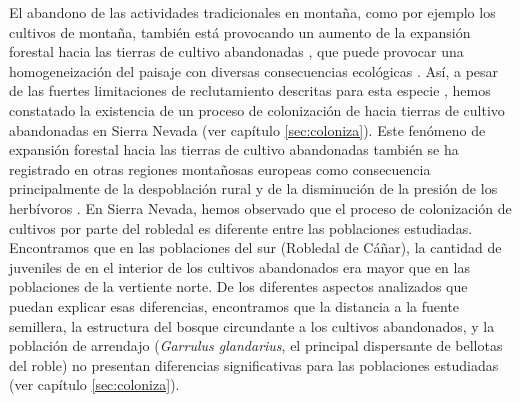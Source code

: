 El abandono de las actividades tradicionales en montaña, como por ejemplo los cultivos de montaña, también está provocando un aumento de la expansión forestal hacia las tierras de cultivo abandonadas \autocites{Piussi2000ExpansionEuropean, AlvarezMartinezetal2014InfluenceLand}, que puede provocar una homogeneización del paisaje \autocites{Mietkiewiczetal2017LongtermChange} con diversas consecuencias ecológicas \autocites{Zimmermannetal2010EffectsLanduse}. Así, a pesar de las fuertes limitaciones de reclutamiento descritas para esta especie \autocites{Bravoetal2008SelviculturaMontes,Gomez2003ImpactVertebrate,Pereaetal2014InteraccionesPlantaanimal}, hemos constatado la existencia de un proceso de colonización de \Qpy hacia tierras de cultivo abandonadas en Sierra Nevada (ver capítulo \ref{sec:coloniza}). Este fenómeno de expansión forestal hacia las tierras de cultivo abandonadas también se ha registrado en otras regiones montañosas europeas \autocites{Amezteguietal2016LanduseLegacies,Nataleetal2007StudyTree,Piussi2000ExpansionEuropean,Amezteguietal2010LanduseChanges,LasantaMartinezetal2005MountainMediterranean,Kozak2003ForestCover,AlvarezMartinezetal2014InfluenceLand,VicenteSerranoetal2004AnalysisSpatial} como consecuencia principalmente de la despoblación rural y de la disminución de la presión de los herbívoros \autocite{MacDonaldetal2000AgriculturalAbandonment,EuropeanEnvironmentAgency2016EuropeanForest}. En Sierra Nevada, hemos observado que el proceso de colonización de cultivos por parte del robledal es diferente entre las poblaciones estudiadas. Encontramos que en las poblaciones del sur (Robledal de Cáñar), la cantidad de juveniles de \Qp en el interior de los cultivos abandonados era mayor que en las poblaciones de la vertiente norte. De los diferentes aspectos analizados que puedan explicar esas diferencias, encontramos que la distancia a la fuente semillera, la estructura del bosque circundante a los cultivos abandonados, y la población de arrendajo (\emph{Garrulus glandarius}, el principal dispersante de bellotas del roble) no presentan diferencias significativas para las poblaciones estudiadas (ver capítulo \ref{sec:coloniza}). 

